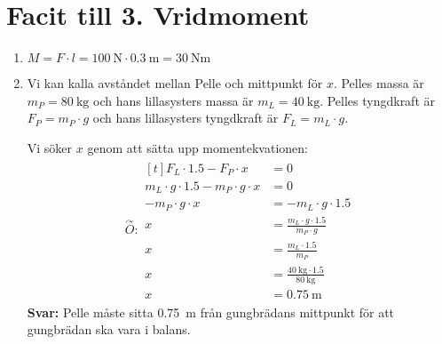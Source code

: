 \documentclass[11pt]{article}
\newcommand{\lessonNumber}{3}
\newcommand{\lessonName}{Vridmoment}
\begin{document}
\raggedright

\section*{Facit till \lessonNumber. \lessonName}
\begin{enumerate}[itemsep=2em]
        \item
              \begin{minipage}[t]{0.5\textwidth}
                      $M = F \cdot l = \SI{100}{\newton} \cdot \SI{0.3}{\meter} = \SI{30}{\newton\metre}$
              \end{minipage}
              \hspace{1em}
              \begin{adjustbox}{valign=t}
                      
              \end{adjustbox}
        \item
              Vi kan kalla avståndet mellan Pelle och mittpunkt för $x$. Pelles massa är $m_P = \SI{80}{\kilogram}$ och hans lillasysters massa är $m_L = \SI{40}{\kilogram}$. Pelles tyngdkraft är $F_P = m_P \cdot g$ och hans lillasysters tyngdkraft är $F_L = m_L \cdot g$.

              Vi söker $x$ genom att sätta upp momentekvationen:
              \begin{align*}
                      \overset{\curvearrowright}{O} : \begin{aligned}[t]
                                                              F_L \cdot 1.5 - F_P \cdot x                 & = 0                                                       \\
                                                              m_L \cdot g \cdot 1.5 - m_P \cdot g \cdot x & = 0                                                       \\
                                                              -m_P \cdot g \cdot x                        & = -m_L \cdot g \cdot 1.5                                  \\
                                                              x                                           & = \frac{m_L \cdot g \cdot 1.5}{m_P \cdot g}               \\
                                                              x                                           & = \frac{m_L \cdot 1.5}{m_P}                               \\
                                                              x                                           & = \frac{\SI{40}{\kilogram} \cdot 1.5}{\SI{80}{\kilogram}} \\
                                                              x                                           & = \SI{0.75}{\meter}
                                                      \end{aligned}
              \end{align*}
              \textbf{Svar:} Pelle måste sitta \SI{0.75}{\meter} från gungbrädans mittpunkt för att gungbrädan ska vara i balans.


\end{enumerate}
\end{document}
